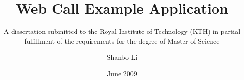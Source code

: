 \title{Web Call Example Application}
\subtitle{A dissertation submitted to
          the Royal Institute of Technology (KTH)
          in partial fulfillment of the requirements for
          the degree of Master of Science}
\author{Shanbo Li}
\date{June 2009}
